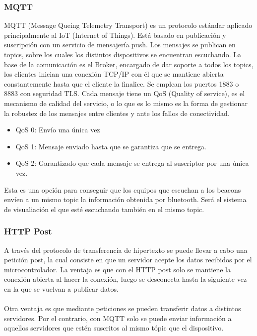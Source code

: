\documentclass[paper=a4, fontsize=11pt,twoside]{scrartcl}	%
\begin{document}
\begin{enumerate}
        \subsubsection {MQTT}
            MQTT (Message Queing Telemetry Transport) es un protocolo estándar aplicado principalmente al IoT (Internet of Things). Está basado en publicación y 
            suscripción con un servicio de mensajería push. Los mensajes se publican en topics, sobre los cuales los distintos 
            dispositivos se encuentran escuchando.
            La base de la comunicación es el Broker, encargado de dar soporte a todos los topics, los clientes inician una 
            conexión TCP/IP con él que se mantiene abierta constantemente hasta que el cliente la finalice. Se emplean los puertos
            1883 o 8883 con seguridad TLS.
            Cada mensaje tiene un QoS (Quality of service), es el mecanismo de calidad del servicio, o lo que es lo mismo es la forma de
            gestionar la robustez de los mensajes entre clientes y ante los fallos de conectividad.
            \begin{itemize}
                \item QoS 0: Envío una única vez
                \item QoS 1: Mensaje enviado hasta que se garantiza que se entrega.
                \item QoS 2: Garantizado que cada mensaje se entrega al suscriptor por una única vez.
            \end{itemize}
            Esta es una opción para conseguir que los equipos que escuchan a los beacons envíen a un mismo
            topic la información obtenida por bluetooth. Será el sistema de visualiación el que esté escuchando también en 
            el mismo topic.
        \subsubsection {HTTP Post}
            A través del protocolo de transferencia de hipertexto se puede llevar a cabo una petición post, la cual consiste en que
            un servidor acepte los datos recibidos por el microcontrolador.
            La ventaja es que con el HTTP post solo se mantiene la conexión abierta al hacer la conexión, luego se desconecta hasta 
            la siguiente vez en la que se vuelvan a publicar datos. 
            \paragraph{}
            Otra ventaja es que mediante peticiones se pueden transferir datos a distintos servidores.
            Por el contrario, con MQTT solo se puede enviar información a aquellos servidores que estén suscritos al mismo tópic que el dispositivo.

\end{enumerate}
\end{document}
